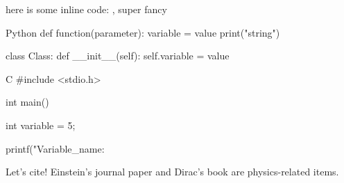 \documentclass{SimpleLatex}
\begin{document}
\tableofcontents
here is some inline code: , super fancy


\pagebreak


\begin{CodeBlock}[10]{Python}
def function(parameter):
    variable = value
    print("string")

class Class:
    def __init__(self):
        self.variable = value
        
\end{CodeBlock}

\begin{CodeBlock}[5]{C}
#include <stdio.h>

int main() {
    int variable = 5;

    printf("Variable_name: %
}
\end{CodeBlock}

Let's cite! Einstein's journal paper \cite{einstein} and Dirac's
book \cite{dirac} are physics-related items. 
\printbibliography
\end{document}
